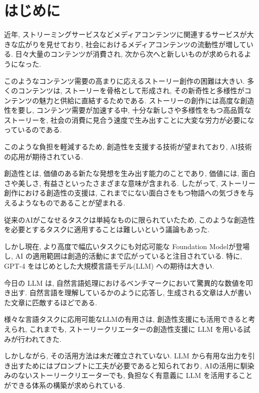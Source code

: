 \section{はじめに}
近年, ストリーミングサービスなどメディアコンテンツに関連するサービスが大きな広がりを見せており, 社会におけるメディアコンテンツの流動性が増している. 日々大量のコンテンツが消費され, 次から次へと新しいものが求められるようになった. 

このようなコンテンツ需要の高まりに応えるストーリー創作の困難は大きい. 多くのコンテンツは, ストーリーを骨格として形成され, その新奇性と多様性がコンテンツの魅力と供給に直結するためである. ストーリーの創作には高度な創造性を要し, コンテンツ需要が加速する中, 十分な新しさや多様性をもつ高品質なストーリーを, 社会の消費に見合う速度で生み出すことに大変な労力が必要になっているのである.

このような負担を軽減するため, 創造性を支援する技術が望まれており, AI技術の応用が期待されている.  

創造性とは, 価値のある新たな発想を生み出す能力のことであり, 価値には, 面白さや美しさ, 有益さといったさまざまな意味が含まれる\cite{ref:Boden09}. したがって, ストーリー創作における創造性の支援は, これまでにない面白さをもつ物語への気づきを与えるようなものであることが望まれる. 

従来のAIがこなせるタスクは単純なものに限られていたため, このような創造性を必要とするタスクに適用することは難しいという議論もあった\cite{ref:Boden09}. 

しかし現在, より高度で幅広いタスクにも対応可能な Foundation Model\cite{ref:Bommasani21}が登場し, AI の適用範囲は創造的活動にまで広がっていると注目されている\cite{ref:Frich19}. 特に, GPT-4\cite{ref:OpenAI23} をはじめとした大規模言語モデル(LLM) への期待は大きい. 

今日の LLM は, 自然言語処理におけるベンチマークにおいて驚異的な数値を叩き出す\cite{ref:Zhao23}. 自然言語を理解しているかのように応答し, 生成される文章は人が書いた文章に匹敵するほどである. 



様々な言語タスクに応用可能なLLMの有用さは, 創造性支援にも活用できると考えられ, これまでも, ストーリークリエーターの創造性支援に LLM を用いる試みが行われてきた\cite{ref:Mirowski23}.

しかしながら, その活用方法は未だ確立されていない. LLM から有用な出力を引き出すためにはプロンプトに工夫が必要であると知られており\cite{ref:Chen23}, AIの活用に馴染みのないストーリークリエーターでも, 負担なく有意義に LLM を活用することができる体系の構築が求められている. 

